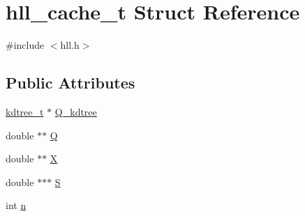 \hypertarget{structhll__cache__t}{
\section{hll\_\-cache\_\-t Struct Reference}
\label{structhll__cache__t}
}


{\ttfamily \#include $<$hll.h$>$}

\subsection*{Public Attributes}
\begin{DoxyCompactItemize}
\item 
\hyperlink{structkdtree}{kdtree\_\-t} $\ast$ \hyperlink{structhll__cache__t_a08ae98a19cb63f02b1afa97396cb3d88}{Q\_\-kdtree}
\item 
double $\ast$$\ast$ \hyperlink{structhll__cache__t_af4938f0607cf4eb7e08fbdb7a65e28d0}{Q}
\item 
double $\ast$$\ast$ \hyperlink{structhll__cache__t_aa49657b2cb0646e475393f35b22d6ab1}{X}
\item 
double $\ast$$\ast$$\ast$ \hyperlink{structhll__cache__t_a864537e23837ff93646de7197de6373a}{S}
\item 
int \hyperlink{structhll__cache__t_a90b9630049c7e84854bb5a860c333986}{n}
\end{DoxyCompactItemize}


